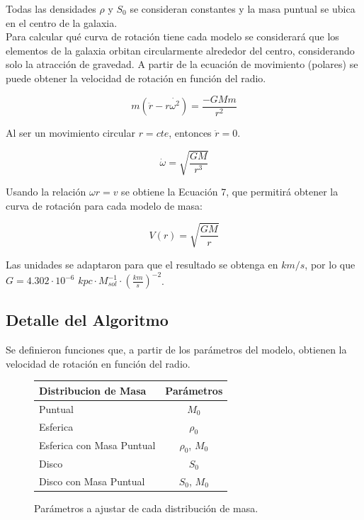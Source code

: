 \documentclass[letterpaper,oneside]{article}
\begin{document}
Todas las densidades $\rho$ y $S_0$ se consideran constantes y la masa puntual se ubica en el centro de la galaxia.\\

Para calcular qué curva de rotación tiene cada modelo se considerará que los elementos de la galaxia orbitan circularmente alrededor del centro, considerando solo la atracción de gravedad. A partir de la ecuación de movimiento (polares) se puede obtener la velocidad de rotación en función del radio.

$$ m(\ddot{r} - r\dot{\omega^{2}}) = \frac{-GMm}{r^2} $$

Al ser un movimiento circular $r=cte$, entonces $\ddot{r}=0$.

$$ \dot{\omega} = \sqrt{\frac{GM}{r^{3}}}  $$

Usando la relación $\omega r = v$ se obtiene la Ecuación 7, que permitirá obtener la curva de rotación para cada modelo de masa:

\begin{equation}
 V(r) = \sqrt{\frac{GM}{r}}   
\end{equation}

Las unidades se adaptaron para que el resultado se obtenga en $km/s$, por lo que $G = 4.302 \cdot 10^{-6}$ $kpc \cdot M_{sol}^{-1} \cdot (\frac{km}{s})^{-2}$.

\subsection{Detalle del Algoritmo}
Se definieron funciones que, a partir de los parámetros del modelo, obtienen la velocidad de rotación en función del radio.

\begin{figure}
    \begin{tabular}{| l | c |}
     \hline
    Distribucion de Masa     & Parámetros  \\ \hline
    Puntual 	              &	$M_0$	\\
    Esferica                  &	$\rho_0$	\\
    Esferica con Masa Puntual &	$\rho_0$, $M_0$	\\
    Disco       	          &	$S_0$	\\
    Disco con Masa Puntual    &	$S_0$, $M_0$	\\
    \hline
    \end{tabular}
    \caption{Parámetros a ajustar de cada distribución de masa.}
\end{figure}
\end{document}
